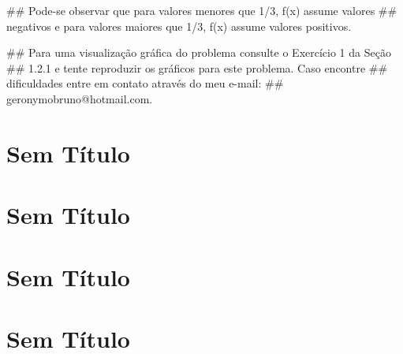 \documentclass[]{book}
\newenvironment{Shaded}{\begin{snugshade}}{\end{snugshade}}
\newcommand{\NormalTok}[1]{#1}
\begin{document}
\begin{enumerate}
\begin{Shaded}
\begin{Highlighting}[]
\NormalTok{##  Pode-se observar que para valores menores que 1/3, f(x) assume valores}
\NormalTok{## negativos e para valores maiores que 1/3, f(x) assume valores positivos.}

\NormalTok{##  Para uma visualização gráfica do problema consulte o Exercício 1 da Seção}
\NormalTok{## 1.2.1 e tente reproduzir os gráficos para este problema. Caso encontre}
\NormalTok{## dificuldades entre em contato através do meu e-mail:}
\NormalTok{## geronymobruno@hotmail.com.}
\end{Highlighting}
\end{Shaded}
\end{enumerate}

\chapter{Sem Título}\label{sem-titulo}

\chapter{Sem Título}\label{sem-titulo-1}

\chapter{Sem Título}\label{sem-titulo-2}

\chapter{Sem Título}\label{sem-titulo-3}


\end{document}
